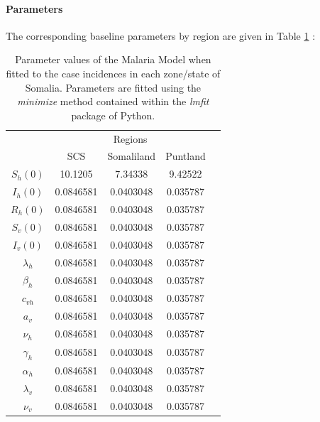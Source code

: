 \documentclass[letter,12pt, usenames,dvipsnames]{article}
\begin{document}
\paragraph{Parameters}

The corresponding baseline parameters by region are given in Table \ref{table:malariaModelValues} :


\begin{table}[h!]
    \centering
    {\footnotesize
    \begin{tabular}{|c||c|c| c| c |}
        \hline
         &\multicolumn{3}{c|}{Regions}\\\cline{2-4}
         & SCS & Somaliland & Puntland\\\hline\hline	 
         
         $S_h(0)$ &10.1205&	7.34338&	9.42522	\\\hline	 
         
        $I_h(0)$ & 	0.0846581&		0.0403048&	0.035787\\\hline
        
        $R_h(0)$ &	0.0846581&	0.0403048&	0.035787\\\hline
        
        $S_v(0)$ & 	0.0846581&		0.0403048&	0.035787\\\hline
        
        $I_v(0)$ & 	0.0846581&		0.0403048&	0.035787\\\hline
        
        $\lambda_h$ &	0.0846581&		0.0403048&	0.035787\\\hline
        
        $\beta_h$ & 	0.0846581&	0.0403048&	0.035787\\\hline
        
        $c_{vh}$ &	0.0846581&	0.0403048&	0.035787\\\hline
        
        $a_v$ & 	0.0846581&	0.0403048&	0.035787\\\hline
        
        $\nu_h$ & 	0.0846581&		0.0403048&	0.035787\\\hline
        
        $\gamma_h$ & 	0.0846581&	0.0403048&	0.035787\\\hline
        
        $\alpha_h$ & 	0.0846581&	0.0403048&	0.035787\\\hline
        
        $\lambda_v$ & 	0.0846581&	0.0403048&	0.035787\\\hline
         
        $\nu_v$ & 	0.0846581&		0.0403048&	0.035787\\\hline
    \end{tabular}
    }
    \caption{Parameter values of the Malaria Model when fitted to the case incidences in each zone/state of Somalia.  Parameters are fitted using the {\it minimize} method contained within the {\it lmfit} package of Python.}
   \label{table:malariaModelValues}
\end{table}
\end{document}
